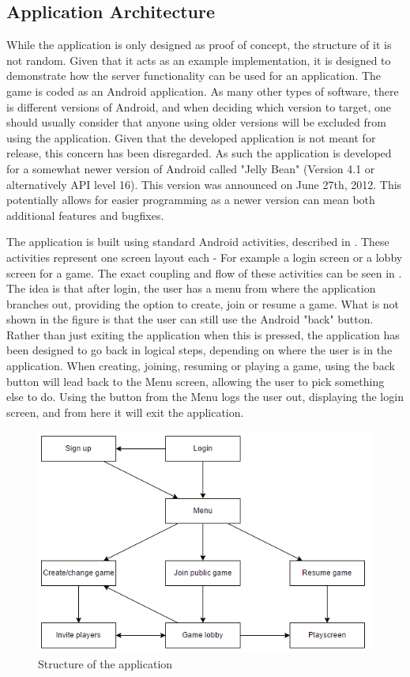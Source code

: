 \subsection{Application Architecture} \label{sec:application_architecture}
While the application is only designed as proof of concept, the structure of it is not random. Given that it acts as an example implementation, it is designed to demonstrate how the server functionality can be used for an application. The game is coded as an Android application. As many other types of software, there is different versions of Android, and when deciding which version to target, one should usually consider that anyone using older versions will be excluded from using the application. Given that the developed application is not meant for release, this concern has been disregarded. As such the application is developed for a somewhat newer version of Android called "Jelly Bean" (Version 4.1 or alternatively API level 16). This version was announced on June 27th, 2012\cite{jelly-bean}. This potentially allows for easier programming as a newer version can mean both additional features and bugfixes.

The application is built using standard Android activities, described in . These activities represent one screen layout each - For example a login screen or a lobby screen for a game. The exact coupling and flow of these activities can be seen in . The idea is that after login, the user has a menu from where the application branches out, providing the option to create, join or resume a game.
What is not shown in the figure is that the user can still use the Android "back" button. Rather than just exiting the application when this is pressed, the application has been designed to go back in logical steps, depending on where the user is in the application. When creating, joining, resuming or playing a game, using the back button will lead back to the Menu screen, allowing the user to pick something else to do. Using the button from the Menu logs the user out, displaying the login screen, and from here it will exit the application.

\begin{figure}[H]
\centering
\includegraphics[width=\textwidth]{billeder/appstructure.png}
\caption{Structure of the application}
\label{fig:appstructure}
\end{figure}


